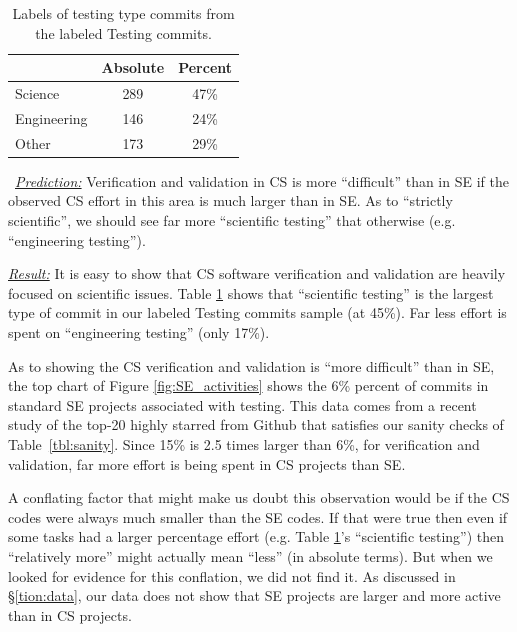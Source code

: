 \documentclass[sigconf,review,anonymous]{acmart}
\begin{document}
\begin{table}
\caption{Labels of testing type commits from the labeled Testing commits.}\label{tbl:testing}
\small \begin{tabular}{l|c|c}
\multicolumn{1}{c|}{} & \multicolumn{1}{c|}{Absolute} & \multicolumn{1}{c}{Percent}\\
\hline
Science & 289 & 47\% \\
Engineering & 146 & 24\% \\
Other & 173 & 29\% 
\end{tabular}
\end{table}\noindent ~\textit{\underline{Prediction:}}
Verification and validation in CS is more
``difficult'' than in SE if the observed CS effort in this area
is much larger than in SE. As to ``strictly scientific'', we should see far more ``scientific
testing'' that otherwise (e.g. ``engineering testing''). 

\noindent \textit{\underline{Result:}}
It is easy to show that CS software verification and validation are heavily focused on scientific issues.
Table \ref{tbl:testing} shows that ``scientific testing'' is the largest type of commit in our labeled Testing commits sample (at 45\%). Far less effort is spent on ``engineering testing'' (only 17\%). 





As to showing the CS verification and validation is ``more difficult'' than in SE,
the top chart of Figure \ref{fig:SE_activities} shows the 6\% percent of commits in standard SE projects associated with testing. This data comes from a recent study \cite{tu2019better} of the top-20 highly starred from Github that satisfies our sanity checks of Table~\ref{tbl:sanity}.
Since 15\% is 2.5 times larger than 6\%, for verification and validation, 
far more effort is being spent in CS projects than SE.

A conflating factor that might make us doubt this observation would be if the CS codes were always much smaller than the SE codes. If that were true then even if some tasks had a larger percentage effort 
(e.g. Table \ref{tbl:testing}'s ``scientific testing'') then  ``relatively more'' might actually
mean ``less'' (in absolute terms). 
But when we looked for evidence for this conflation, we did not find it.
As discussed in \S\ref{tion:data},
our data does not show that  SE projects are larger and more active
than in CS projects.
\end{document}
